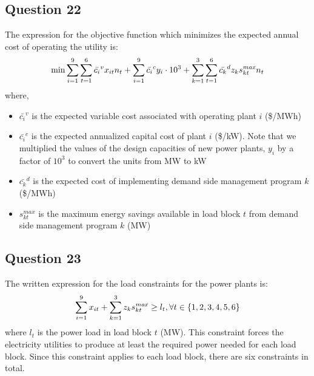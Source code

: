 \documentclass[11pt,a4paper]{article}
\begin{document}
\subsection*{Question 22}
The expression for the objective function which minimizes the expected annual cost of operating the utility is:
\begin{align*}
	\min \sum_{i=1}^{9}\sum_{t=1}^{6} \bar{c_{i}}^{v}x_{it}n_{t} + \sum_{i=1}^{9}\bar{c_{i}}^{c}y_{i}\cdot 10^3 + \sum_{k=1}^{3}\sum_{t=1}^{6}\bar{c_{k}}^{d}z_{k}s_{kt} ^{\text{\textit{max}}}n_{t}
\end{align*}
where,
\begin{itemize}
	\item $\bar{c_{i}}^{v}$ is the expected variable cost associated with operating plant $i$ (\$/MWh)
	\item $\bar{c_{i}}^{c}$	is the expected annualized capital cost of  plant $i$ (\$/kW). Note that we multiplied the values of the design capacities of new power plants, $y_i$ by a factor of $10^3$ to convert the units from MW to kW
	\item $\bar{c_{k}}^{d}$ is the expected cost of implementing demand side management program $k$ (\$/MWh)
	\item $s_{kt} ^{max}$ is the maximum energy savings available in load block $t$ from demand side management program $k$ (MW)
\end{itemize}

\subsection*{Question 23}
The written expression for the load constraints for the power plants is:
\begin{align*}
	\sum_{i=1}^{9}x_{it} + \sum_{k=1}^{3}z_{k}s_{kt}^{\text{\textit{max}}}\geq l_{t},   \forall t\in{}\{1,2,3,4,5,6\}\\
\end{align*}
where $l_{t}$ is the power load in load block $t$ (MW). This constraint forces the electricity utilities to produce at least the required power needed for each load block. Since this constraint applies to each load block, there are six constraints in total.
\end{document}
